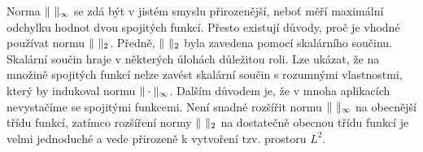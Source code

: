 Norma $\|\ \|_\infty$ se zdá být v jistém smyslu přirozenější, neboť měří maximální odchylku hodnot dvou spojitých funkcí.
Přesto existují důvody, proč je vhodné používat normu $\|\ \|_2$.
Předně, $\|\ \|_2$ byla zavedena pomocí skalárního součinu. Skalární součin hraje v některých úlohách důležitou roli.
Lze ukázat, že na množině spojitých funkcí nelze zavést skalární součin s rozumnými vlastnostmi, který by indukoval normu $\|\cdot\|_\infty$.
Dalším důvodem je, že v mnoha aplikacích nevystačíme se spojitými funkcemi. Není snadné rozšířit normu $\|\ \|_\infty$ na obecnější třídu funkcí, zatímco rozšíření normy $\|\ \|_2$ na dostatečně obecnou třídu funkcí je velmi jednoduché a vede přirozeně k vytvoření tzv. prostoru $L^2$.





